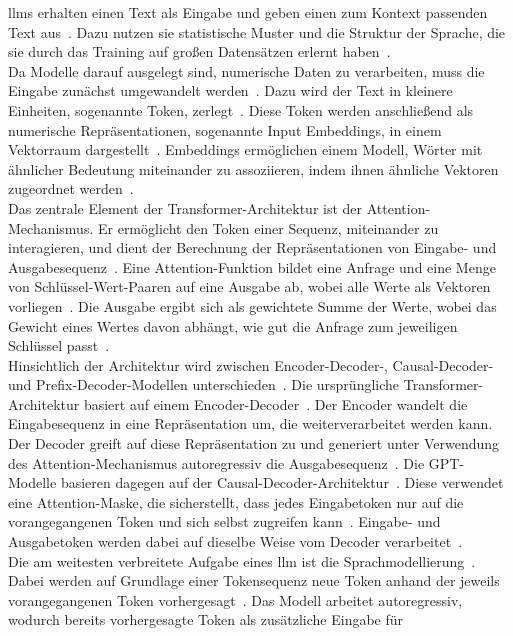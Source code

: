 \acp{llm} erhalten einen Text als Eingabe und geben einen zum Kontext passenden Text aus~\cite[2978]{cb01}. Dazu nutzen sie statistische Muster und die Struktur
der Sprache, die sie durch das Training auf großen Datensätzen erlernt haben~\cite[2978]{cb01}. \\
Da Modelle darauf ausgelegt sind, numerische Daten zu verarbeiten, muss die Eingabe zunächst umgewandelt werden~\cite[2991]{cb01}. Dazu wird der Text in kleinere 
Einheiten, sogenannte Token, zerlegt~\cite[2991]{cb01}. Diese Token werden anschließend als numerische Repräsentationen, sogenannte Input Embeddings, in einem
Vektorraum dargestellt~\cite[2991]{cb01}. Embeddings ermöglichen einem Modell, Wörter mit ähnlicher Bedeutung miteinander zu assoziieren, indem ihnen
ähnliche Vektoren zugeordnet werden~\cite[2991]{cb01}. \\
Das zentrale Element der Transformer-Architektur ist der Attention-Mechanismus. Er ermöglicht den Token einer Sequenz, miteinander zu interagieren, und dient der
Berechnung der Repräsentationen von Eingabe- und Ausgabesequenz~\cite[25]{llm09}. Eine Attention-Funktion bildet eine Anfrage und eine Menge von Schlüssel-Wert-Paaren 
auf eine Ausgabe ab, wobei alle Werte als Vektoren vorliegen~\cite[3\psq]{llm06}. Die Ausgabe ergibt sich als gewichtete Summe der Werte, wobei das Gewicht eines 
Wertes davon abhängt, wie gut die Anfrage zum jeweiligen Schlüssel passt~\cite[3\psq]{llm06}. \\
Hinsichtlich der Architektur wird zwischen Encoder-Decoder-, Causal-Decoder- und Prefix-Decoder-Modellen unterschieden~\cite[22]{llm09}. Die ursprüngliche 
Transformer-Architektur basiert auf einem Encoder-Decoder~\cite[22]{llm09}. Der Encoder wandelt die Eingabesequenz in eine Repräsentation um, die 
weiterverarbeitet werden kann. Der Decoder greift auf diese Repräsentation zu und generiert unter Verwendung des Attention-Mechanismus autoregressiv die
Ausgabesequenz~\cite[22]{llm09}. Die GPT-Modelle basieren dagegen auf der Causal-Decoder-Architektur~\cite[22]{llm09}. Diese verwendet eine Attention-Maske, die
sicherstellt, dass jedes Eingabetoken nur auf die vorangegangenen Token und sich selbst zugreifen kann~\cite[22]{llm09}. Eingabe- und Ausgabetoken werden dabei auf
dieselbe Weise vom Decoder verarbeitet~\cite[22]{llm09}. \\
Die am weitesten verbreitete Aufgabe eines \ac{llm} ist die Sprachmodellierung~\cite[26]{llm09}. Dabei werden auf Grundlage einer Tokensequenz neue Token anhand der 
jeweils vorangegangenen Token vorhergesagt~\cite[26]{llm09}. Das Modell arbeitet autoregressiv, wodurch bereits vorhergesagte Token als zusätzliche Eingabe für
